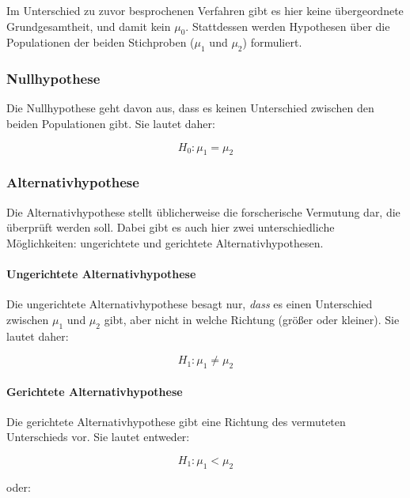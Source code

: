 \documentclass[
  11pt,
  ngerman,
  a4paper,
]{report}
\begin{document}
Im Unterschied zu zuvor besprochenen Verfahren gibt es hier keine übergeordnete Grundgesamtheit, und damit kein \(\mu_0\). Stattdessen werden Hypothesen über die Populationen der beiden Stichproben (\(\mu_1\) und \(\mu_2\)) formuliert.

\hypertarget{nullhypothese-2}{%
\subsubsection{Nullhypothese}\label{nullhypothese-2}}

Die Nullhypothese geht davon aus, dass es keinen Unterschied zwischen den beiden Populationen gibt. Sie lautet daher:

\[
H_0 : \mu_1 = \mu_2
\label{eq:h20}
\]

\hypertarget{alternativhypothese-2}{%
\subsubsection{Alternativhypothese}\label{alternativhypothese-2}}

Die Alternativhypothese stellt üblicherweise die forscherische Vermutung dar, die überprüft werden soll. Dabei gibt es auch hier zwei unterschiedliche Möglichkeiten: ungerichtete und gerichtete Alternativhypothesen.

\hypertarget{ungerichtete-alternativhypothese-1}{%
\paragraph{Ungerichtete Alternativhypothese}\label{ungerichtete-alternativhypothese-1}}

Die ungerichtete Alternativhypothese besagt nur, \emph{dass} es einen Unterschied zwischen \(\mu_1\) und \(\mu_2\) gibt, aber nicht in welche Richtung (größer oder kleiner). Sie lautet daher:

\[
H_1 : \mu_1 \neq \mu_2
\label{eq:h21u}
\]

\hypertarget{gerichtete-alternativhypothese-1}{%
\paragraph{Gerichtete Alternativhypothese}\label{gerichtete-alternativhypothese-1}}

Die gerichtete Alternativhypothese gibt eine Richtung des vermuteten Unterschieds vor. Sie lautet entweder:

\[
H_1 : \mu_1 < \mu_2
\label{eq:h21l}
\]

oder:
\end{document}
